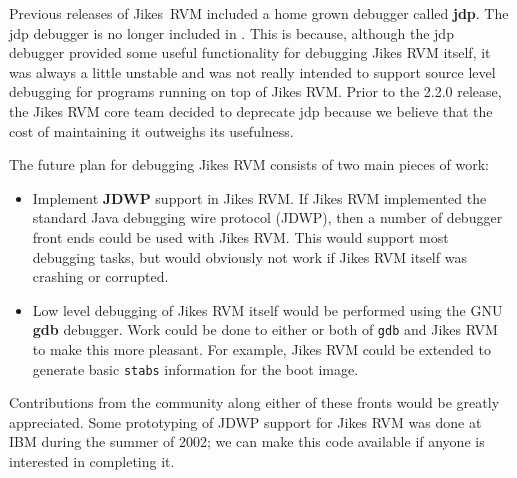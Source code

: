 Previous releases of Jikes\JikesTMFootnote\ RVM included a home grown
debugger called {\bf jdp}.  The jdp debugger is no longer included in
\jrvm{}.  This is because, although the jdp debugger provided some
useful functionality for debugging Jikes RVM itself, it was always a
little unstable and was not really intended to support source level
debugging for programs running on top of Jikes RVM.  Prior to the
2.2.0 release, the Jikes RVM core team decided to deprecate jdp
because we believe that the cost of maintaining it outweighs its
usefulness.


The future plan for debugging Jikes RVM consists of two main pieces of
work:

\begin{itemize}
\item Implement {\bf JDWP} support in Jikes RVM. If Jikes RVM
implemented the standard Java debugging wire protocol (JDWP), then a
number of debugger front ends could be used with Jikes RVM.  This
would support most debugging tasks, but would obviously not work if
Jikes RVM itself was crashing or corrupted.

\item Low level debugging of Jikes RVM itself would be performed using
the GNU {\bf gdb} debugger.  Work could be done to either or both of
{\tt gdb} and Jikes RVM to make this more pleasant.  For example,
Jikes RVM could be extended to generate basic {\tt stabs} information
for the boot image.
\end{itemize}

Contributions from the community along either of these fronts would be
greatly appreciated.  Some prototyping of JDWP support for Jikes RVM
was done at IBM during the summer of 2002; we can make this code
available if anyone is interested in completing it.


